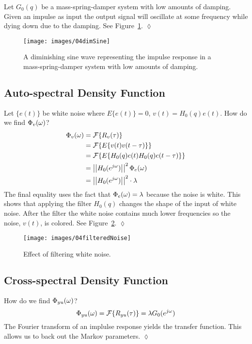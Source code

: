 \begin{example}
Let $G_0(q)$ be a mass-spring-damper system with low amounts of damping.
Given an impulse as input the output signal will oscillate at some frequency while dying down due to the damping.
See Figure~\ref{fig:04dimSine}.
$\lozenge$
\end{example}
\begin{figure}[ht!]
\centering
\texttt{[image: images/04dimSine]}
\caption{A diminishing sine wave representing the impulse response in a mass-spring-damper system with low amounts of damping.}
\label{fig:04dimSine}
\end{figure}

\subsection{Auto-spectral Density Function}
\begin{example}
Let $\{e(t)\}$ be white noise where $E\{e(t)\}=0$, $v(t)=H_0(q)e(t)$.
How do we find $\Phi_v(\omega)$?
\begin{align*}
\Phi_v(\omega) &= \mathcal{F}\{R_v(\tau)\} \\
&= \mathcal{F}\{E\{v(t)v(t-\tau)\}\} \\
&= \mathcal{F}\{E\{H_0(q)e(t)H_0(q)e(t-\tau)\}\} \\
&= \left|\left|H_0(e^{j\omega})\right|\right|^2\Phi_e(\omega) \\
&= \left|\left|H_0(e^{j\omega})\right|\right|^2\cdot\lambda
\end{align*}
The final equality uses the fact that $\Phi_e(\omega)=\lambda$ because the noise is white.
This shows that applying the filter $H_0(q)$ changes the shape of the input of white noise.
After the filter the white noise contains much lower frequencies so the noise, $v(t)$, is colored.
See Figure~\ref{fig:04filteredNoise}.
$\lozenge$
\end{example}
\begin{figure}[ht!]
\centering
\texttt{[image: images/04filteredNoise]}
\caption{Effect of filtering white noise.}
\label{fig:04filteredNoise}
\end{figure}

\subsection{Cross-spectral Density Function}
\begin{example}
How do we find $\Phi_{yu}(\omega)$?
$$\Phi_{yu}(\omega) = \mathcal{F}\{R_{yu}(\tau)\} = \lambda G_0(e^{j\omega})$$
The Fourier transform of an implulse response yields the transfer function.
This allows us to back out the Markov parameters.
$\lozenge$
\end{example}

